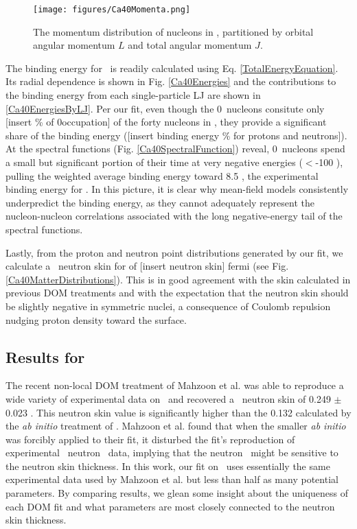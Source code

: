 \begin{figure}[tb]
    \centering
    \texttt{[image: figures/Ca40Momenta.png]}
    \caption[The single-particle momentum distributions in \caForty]
    {
        The momentum distribution of nucleons in \caForty, partitioned
        by orbital angular momentum $L$ and total angular momentum $J$.
    }
    \label{Ca40Momenta}
\end{figure}

The binding energy for \caForty\ is readily calculated using Eq.
\ref{TotalEnergyEquation}. Its radial dependence is shown in Fig. \ref{Ca40Energies} and the
contributions to the binding energy from each single-particle LJ are shown in
\ref{Ca40EnergiesByLJ}. Per our fit, even though the 0\sOne\ nucleons consitute only [insert \%
of 0\sOne occupation] of the forty nucleons in \caForty, they provide a significant
share of the binding
energy ([insert binding energy \% for protons and neutrons]). At the spectral
functions (Fig. \ref{Ca40SpectralFunction}) reveal, 0\sOne\ nucleons spend a small but significant portion of their time 
at very negative energies ($<$-100 \mega\electronvolt), pulling the weighted average binding energy toward
8.5 \mega\electronvolt{}, the experimental binding energy for \caForty. In this
picture, it is clear why mean-field models consistently underpredict the binding energy, as they
cannot adequately represent the nucleon-nucleon correlations associated with the long
negative-energy tail of the spectral functions.

Lastly, from the proton and neutron point distributions generated by our fit, we calculate a
\caForty\ neutron skin for of [insert neutron skin] fermi (see Fig. \ref{Ca40MatterDistributions}). 
This is in good agreement with the skin calculated in previous DOM treatments
\cite{MahzoonPhDThesis} and with the expectation that the neutron skin should be slightly negative in
symmetric nuclei, a consequence of Coulomb repulsion nudging proton density toward the surface.

\subsection{Results for \caEight}
The recent non-local DOM treatment of Mahzoon et al. \cite{Mahzoon2017} was able
to reproduce a wide variety of
experimental data on \caEight\ and recovered a \caEight
\ neutron skin of 0.249 $\pm$ 0.023 \femto\meter.
This neutron skin value is significantly higher than the 0.132 \femto\meter calculated by
the \textit{ab initio} treatment of \cite{Hagen2016}. Mahzoon et al. found that when the 
smaller \textit{ab initio} was forcibly applied to their fit, it disturbed the fit's
reproduction of experimental \caEight\ neutron \tot\ data, implying that the neutron \tot\ might
be sensitive to the neutron skin thickness. In this work, our fit on \caEight\ uses essentially the 
same experimental data used by Mahzoon et al. but less than half as many potential parameters.
By comparing results, we glean some insight about the uniqueness of each DOM fit and what parameters
are most closely connected to the neutron skin thickness.

